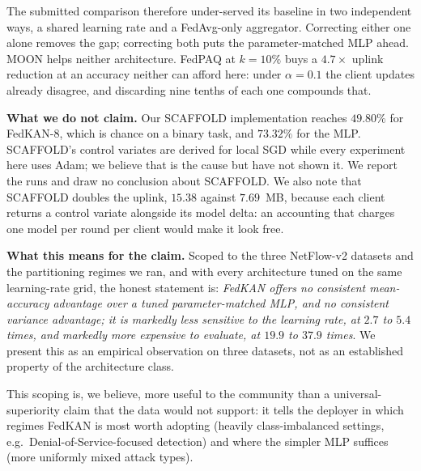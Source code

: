 The submitted comparison therefore under-served its baseline in two independent ways, a shared
learning rate and a FedAvg-only aggregator. Correcting either one alone removes the gap;
correcting both puts the parameter-matched MLP ahead. MOON helps neither architecture. FedPAQ at
$k=10\%$ buys a $4.7\times$ uplink reduction at an accuracy neither can afford here: under
$\alpha=0.1$ the client updates already disagree, and discarding nine tenths of each one
compounds that.

\textbf{What we do not claim.} Our SCAFFOLD implementation reaches $49.80\%$ for FedKAN-8,
which is chance on a binary task, and $73.32\%$ for the MLP. SCAFFOLD's control variates are
derived for local SGD while every experiment here uses Adam; we believe that is the cause but
have not shown it. We report the runs and draw no conclusion about SCAFFOLD. We also note that
SCAFFOLD doubles the uplink, $15.38$ against $7.69$~MB, because each client returns a control
variate alongside its model delta: an accounting that charges one model per round per client
would make it look free.

\textbf{What this means for the claim.} Scoped to the three NetFlow-v2 datasets and the
partitioning regimes we ran, and with every architecture tuned on the same learning-rate grid,
the honest statement is: \emph{FedKAN offers no consistent mean-accuracy advantage over a
tuned parameter-matched MLP, and no consistent variance advantage; it is markedly less
sensitive to the learning rate, at $2.7$ to $5.4$ times, and markedly more expensive to
evaluate, at $19.9$ to $37.9$ times}. We present this as an empirical observation on three
datasets, not as an established property of the architecture class.

This scoping is, we believe, more useful to the community than a universal-superiority claim that the data would not support: it tells the deployer in which regimes FedKAN is most worth adopting (heavily class-imbalanced settings, e.g.\ Denial-of-Service-focused detection) and where the simpler MLP suffices (more uniformly mixed attack types).

